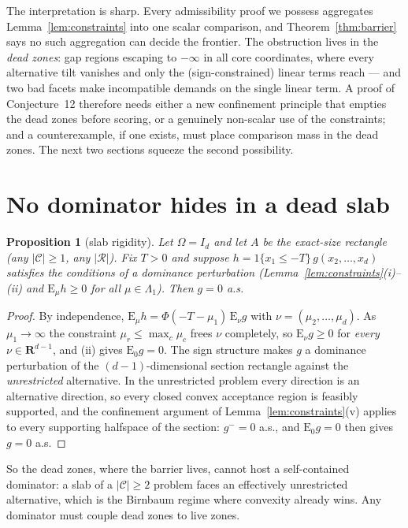 \documentclass[12pt]{article}
\newtheorem{propc}[lemc]{Proposition}
\theoremstyle{remark}
\newcommand{\E}{\mathrm E}
\newcommand{\R}{\mathbf R}
\newcommand{\cC}{\mathcal C}
\newcommand{\cR}{\mathcal R}
\begin{document}
The interpretation is sharp. Every admissibility proof we possess
aggregates Lemma~\ref{lem:constraints} into one scalar comparison, and
Theorem~\ref{thm:barrier} says no such aggregation can decide the frontier.
The obstruction lives in the \emph{dead zones}: gap regions escaping to
$-\infty$ in all core coordinates, where every alternative tilt vanishes
and only the (sign-constrained) linear terms reach --- and two bad facets
make incompatible demands on the single linear term. A proof of
Conjecture~12 therefore needs either a new confinement principle that
empties the dead zones before scoring, or a genuinely non-scalar use of the
constraints; and a counterexample, if one exists, must place comparison
mass in the dead zones. The next two sections squeeze the second
possibility.

\section{No dominator hides in a dead slab}

\begin{propc}[slab rigidity]\label{prop:slab}
Let $\Omega=I_d$ and let $A$ be the exact-size rectangle (any $|\cC|\ge1$,
any $|\cR|$). Fix $T>0$ and suppose $h=1\{x_1\le-T\}\,g(x_2,\dots,x_d)$
satisfies the conditions of a dominance perturbation
(Lemma~\ref{lem:constraints}(i)--(ii) and $\E_\mu h\ge0$ for all
$\mu\in\Lambda_1$). Then $g=0$ a.s.
\end{propc}

\begin{proof}
By independence, $\E_\mu h=\Phi(-T-\mu_1)\,\E_\nu g$ with
$\nu=(\mu_2,\dots,\mu_d)$. As $\mu_1\to\infty$ the constraint
$\mu_r\le\max_c\mu_c$ frees $\nu$ completely, so $\E_\nu g\ge0$ for
\emph{every} $\nu\in\R^{d-1}$, and (ii) gives $\E_0g=0$. The sign structure
makes $g$ a dominance perturbation of the $(d-1)$-dimensional section
rectangle against the \emph{unrestricted} alternative. In the unrestricted
problem every direction is an alternative direction, so every closed convex
acceptance region is feasibly supported, and the confinement argument of
Lemma~\ref{lem:constraints}(v) applies to every supporting halfspace of the
section: $g^-=0$ a.s., and $\E_0g=0$ then gives $g=0$ a.s.
\end{proof}

So the dead zones, where the barrier lives, cannot host a self-contained
dominator: a slab of a $|\cC|\ge2$ problem faces an effectively
unrestricted alternative, which is the Birnbaum regime where convexity
already wins. Any dominator must couple dead zones to live zones.
\end{document}
